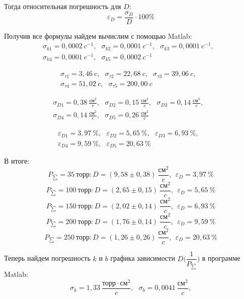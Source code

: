 Тогда относительная погрешность для $D$:
\begin{equation}
	\varepsilon_D = \frac{\sigma_D}{D}\cdot 100\%
\end{equation}

Получив все формулы найдем вычислим с помощью Matlab:
\begin{multline}
	\sigma_{k1} = 0,0002\ c^{-1},~~~\sigma_{k2} = 0,0001\  c^{-1},~~~\sigma_{k3} = 0,0001\ c^{-1},~~~\\
	\sigma_{k4} = 0,0001\ c^{-1},~~~\sigma_{k5} = 0,0002\ c^{-1}~~~
\end{multline}

\begin{multline}
	\sigma_{\tau 1} = 3,46\ c,~~~\sigma_{\tau 2} = 22,68\ c,~~~\sigma_{\tau 3} = 39,06\ c,~~~\\
	\sigma_{\tau 4} = 51,02\ c,~~~\sigma_{\tau 5} = 200,00\ c~~~
\end{multline}

\begin{multline}
	\sigma_{D1} = 0,38\ \frac{\text{см}^2}{c},~~~\sigma_{D2} = 0,15\ \frac{\text{см}^2}{c},~~~\sigma_{D3} = 0,14\ \frac{\text{см}^2}{c},~~~\\
	\sigma_{D4} = 0,14\ \frac{\text{см}^2}{c},~~~\sigma_{D5} = 0,26\ \frac{\text{см}^2}{c}~~~
\end{multline}

\begin{multline}
	\varepsilon_{D1} = 3,97\ \%,~~~\varepsilon_{D2} = 5,65\ \%,~~~\varepsilon_{D3} = 6,93\ \%,~~~\\
	\varepsilon_{D4} = 9,59\ \%,~~~\varepsilon_{D5} = 20,63\ \%~~~
\end{multline}

В итоге:
\[P_{\sum} = 35 \ \text{торр}: D = (9,58 \pm 0,38)\  \frac{\text{см}^2}{c}, \ ~ \varepsilon_{D} = 3,97\ \%\]
\[P_{\sum} = 100\ \text{торр}: D = (2,65 \pm 0,15)\  \frac{\text{см}^2}{c}, \ ~ \varepsilon_{D} = 5,65\ \%\]
\[P_{\sum} = 150\ \text{торр}: D = (2,02 \pm 0,14)\  \frac{\text{см}^2}{c}, \ ~ \varepsilon_{D} = 6,93\ \%\]
\[P_{\sum} = 200\ \text{торр}: D = (1,76 \pm 0,14)\  \frac{\text{см}^2}{c}, \ ~ \varepsilon_{D} = 9,59\ \%\]
\[P_{\sum} = 250\ \text{торр}: D = (1,26 \pm 0,26)\  \frac{\text{см}^2}{c}, \ ~ \varepsilon_{D} = 20,63\ \%\]

Теперь найдем погрешность $k$ и $b$ графика зависимости $D\bigg(\dfrac{1}{P_{\sum}}\bigg)$ в программе Matlab:
\begin{equation}
	\sigma_k = 1,33 \ \frac{\text{торр}\cdot \text{см}^2}{c}, \ ~ \ \sigma_b = 0,0041 \ \frac{\text{см}^2}{c},
\end{equation}

